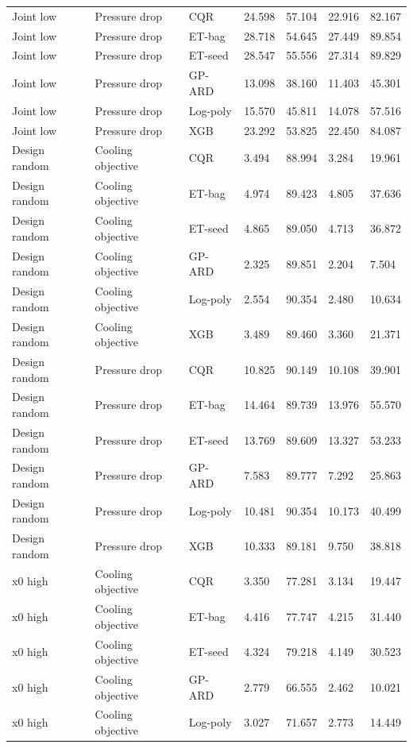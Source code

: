 \begin{longtable}{lllllll}
Joint low & Pressure drop & CQR & 24.598 & 57.104 & 22.916 & 82.167\\
Joint low & Pressure drop & ET-bag & 28.718 & 54.645 & 27.449 & 89.854\\
Joint low & Pressure drop & ET-seed & 28.547 & 55.556 & 27.314 & 89.829\\
Joint low & Pressure drop & GP-ARD & 13.098 & 38.160 & 11.403 & 45.301\\
Joint low & Pressure drop & Log-poly & 15.570 & 45.811 & 14.078 & 57.516\\
Joint low & Pressure drop & XGB & 23.292 & 53.825 & 22.450 & 84.087\\
Design random & Cooling objective & CQR & 3.494 & 88.994 & 3.284 & 19.961\\
Design random & Cooling objective & ET-bag & 4.974 & 89.423 & 4.805 & 37.636\\
Design random & Cooling objective & ET-seed & 4.865 & 89.050 & 4.713 & 36.872\\
Design random & Cooling objective & GP-ARD & 2.325 & 89.851 & 2.204 & 7.504\\
Design random & Cooling objective & Log-poly & 2.554 & 90.354 & 2.480 & 10.634\\
Design random & Cooling objective & XGB & 3.489 & 89.460 & 3.360 & 21.371\\
Design random & Pressure drop & CQR & 10.825 & 90.149 & 10.108 & 39.901\\
Design random & Pressure drop & ET-bag & 14.464 & 89.739 & 13.976 & 55.570\\
Design random & Pressure drop & ET-seed & 13.769 & 89.609 & 13.327 & 53.233\\
Design random & Pressure drop & GP-ARD & 7.583 & 89.777 & 7.292 & 25.863\\
Design random & Pressure drop & Log-poly & 10.481 & 90.354 & 10.173 & 40.499\\
Design random & Pressure drop & XGB & 10.333 & 89.181 & 9.750 & 38.818\\
x0 high & Cooling objective & CQR & 3.350 & 77.281 & 3.134 & 19.447\\
x0 high & Cooling objective & ET-bag & 4.416 & 77.747 & 4.215 & 31.440\\
x0 high & Cooling objective & ET-seed & 4.324 & 79.218 & 4.149 & 30.523\\
x0 high & Cooling objective & GP-ARD & 2.779 & 66.555 & 2.462 & 10.021\\
x0 high & Cooling objective & Log-poly & 3.027 & 71.657 & 2.773 & 14.449\\

\end{longtable}
